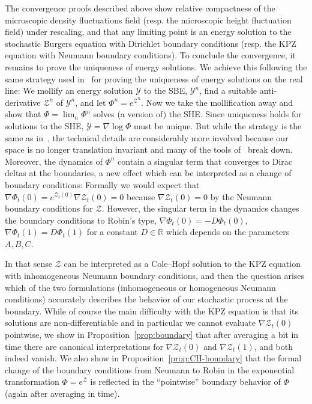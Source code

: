 \documentclass[10pt]{amsart}
\theoremstyle{definition}\newtheorem{defi}[theo]{Definition}\newtheorem{rema}[theo]{Remark}\newtheorem{exam}[theo]{Example}\newtheorem{exem}[theo]{Example}\newtheorem{nota}[theo]{Notation}
\newcommand{\bb}[1]{{\mathbb #1}}
\newcommand{\mc}[1]{{\mathcal #1}}
\renewcommand{\mc}[1]{{\mathcal #1}}
\begin{document}
The convergence proofs described above show relative compactness of the microscopic density fluctuations field (resp. the microscopic height fluctuation field) under rescaling, and that any limiting point is an energy solution to the stochastic Burgers equation with Dirichlet boundary conditions (resp. the KPZ equation with Neumann boundary conditions). To conclude the convergence, it remains to prove the uniqueness of energy solutions. We achieve this following the same strategy used in~\cite{Gubinelli2015Energy} for proving the uniqueness of energy solutions on the real line: We mollify an energy solution $\mc Y$ to the SBE, $\mc Y^n$, find a suitable anti-derivative $\mc Z^n$ of $\mc Y^n$, and let $\Phi^n = e^{\mc Z^n}$. Now we take the mollification away and show that $\Phi = \lim_n \Phi^n$ solves (a version of) the SHE. Since uniqueness holds for solutions to the SHE, $\mc Y = \nabla \log \Phi$ must be unique. But while the strategy is the same as in~\cite{Gubinelli2015Energy}, the technical details are considerably more involved because our space is no longer translation invariant and many of the tools of~\cite{Gubinelli2015Energy} break down. Moreover, the dynamics of $\Phi^n$ contain a singular term that converges to Dirac deltas at the boundaries, a new effect which can be interpreted as a change of boundary conditions: Formally we would expect that $\nabla \Phi_t(0) = e^{\mc Z_t(0)} \nabla \mc Z_t(0) = 0$ because $\nabla \mc Z_t(0) = 0$ by the Neumann boundary conditions for $\mc Z$. However, the singular term in the dynamics changes the boundary conditions to Robin's type, $\nabla \Phi_t(0) = -D \Phi_t(0)$, $\nabla \Phi_t(1) = D \Phi_t(1)$ for a constant $D \in \bb R$ which depends on the parameters $A,B,C$.

In that sense $\mc Z$ can be interpreted as a Cole--Hopf solution to the KPZ equation with inhomogeneous Neumann boundary conditions, and then the question arises which of the two formulations (inhomogeneous or homogeneous Neumann conditions) accurately describes the behavior of our stochastic process at the boundary. While of course the main difficulty with the KPZ equation is that its solutions are non-differentiable and in particular we cannot evaluate $\nabla \mc Z_t(0)$ pointwise, we show in Proposition~\ref{prop:boundary} that after averaging a bit in time there are canonical interpretations for $\nabla \mc Z_t(0)$ and $\nabla \mc Z_t(1)$, and both indeed vanish. We also show in Proposition~\ref{prop:CH-boundary} that the formal change of the boundary conditions from Neumann to Robin in the exponential transformation $\Phi = e^{\mc Z}$ is reflected in the ``pointwise'' boundary behavior of $\Phi$ (again after averaging in time).
\end{document}
